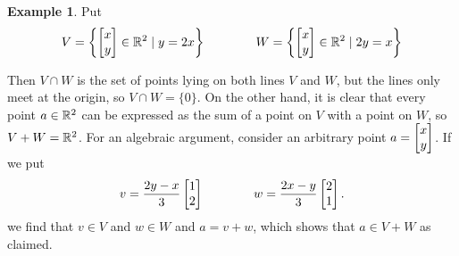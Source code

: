\documentclass[reqno]{amsart}
\theoremstyle{definition}
\newtheorem{example}[theorem]{Example}
\begin{document}
\begin{example}\label{eg-sum-meet-i}
 Put
 \[ V = \left\{\left[\begin{matrix} x\\ y\end{matrix}\right]\in{\mathbb{R}}^2\;|\; y=2x\right\} \hspace{4em}
    W = \left\{\left[\begin{matrix} x\\ y\end{matrix}\right]\in{\mathbb{R}}^2\;|\; 2y=x\right\}
 \]

 \bigskip

 \begin{center}
 \end{center}
 Then $V\cap W$ is the set of points lying on both lines $V$ and $W$, but the
 lines only meet at the origin, so $V\cap W=\{0\}$.  On the other hand,
 it is clear that every point $a\in{\mathbb{R}}^2$ can be expressed as the sum
 of a point on $V$ with a point on $W$, so $V+W={\mathbb{R}}^2$.  For an
 algebraic argument, consider an arbitrary point $a=\left[\begin{matrix} x\\y \end{matrix}\right]$.
 If we put
 \[ v = \frac{2y-x}{3}\left[\begin{matrix} 1\\ 2\end{matrix}\right] \hspace{4em}
    w = \frac{2x-y}{3}\left[\begin{matrix} 2\\ 1\end{matrix}\right].
 \]
 we find that $v\in V$ and $w\in W$ and $a=v+w$, which shows that
 $a\in V+W$ as claimed.
\end{example}
\end{document}
